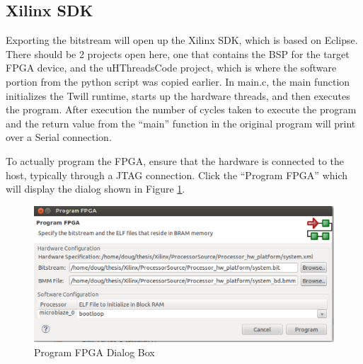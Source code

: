 \subsection{Xilinx SDK}
Exporting the bitstream will open up the Xilinx SDK, which is based on Eclipse. There should be 2 projects open here, one that contains the BSP for the target FPGA device, and the uHThreadsCode project, which is where the software portion from the python script was copied earlier. In main.c, the main function initializes the Twill runtime, starts up the hardware threads, and then executes the program. After execution the number of cycles taken to execute the program and the return value from the ``main'' function in the original program will print over a Serial connection.

To actually program the FPGA, ensure that the hardware is connected to the host, typically through a JTAG connection. Click the ``Program FPGA'' which will display the dialog shown in Figure \ref{fig:fpga_diag_box}.

\begin{figure}
	\centering
		\includegraphics[width=\textwidth]{figures/fpga_diag_box}
	\caption{Program FPGA Dialog Box\label{fig:fpga_diag_box}}
\end{figure}